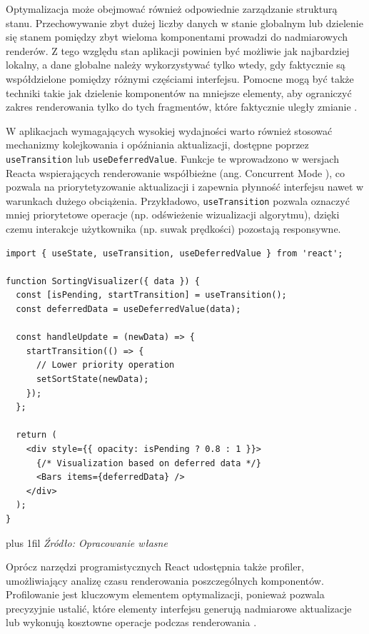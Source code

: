 \documentclass[12pt,openright,twoside]{report}
\newcommand{\source}[1]{{\par\vspace{5pt}\noindent\leftskip=0pt \rightskip=0pt \parfillskip=0pt plus 1fil \footnotesize\textit{Źródło: #1}\par}}
\begin{document}
Optymalizacja może obejmować również odpowiednie zarządzanie strukturą stanu. Przechowywanie zbyt dużej liczby danych w stanie globalnym lub dzielenie się stanem pomiędzy zbyt wieloma komponentami prowadzi do nadmiarowych renderów. Z tego względu stan aplikacji powinien być możliwie jak najbardziej lokalny, a dane globalne należy wykorzystywać tylko wtedy, gdy faktycznie są współdzielone pomiędzy różnymi częściami interfejsu. Pomocne mogą być także techniki takie jak dzielenie komponentów na mniejsze elementy, aby ograniczyć zakres renderowania tylko do tych fragmentów, które faktycznie uległy zmianie \cite{Learn_React_Design}.

W aplikacjach wymagających wysokiej wydajności warto również stosować mechanizmy kolejkowania i opóźniania aktualizacji, dostępne poprzez \texttt{useTransition} lub \texttt{useDeferredValue}. Funkcje te wprowadzono w wersjach Reacta wspierających renderowanie współbieżne (ang. Concurrent Mode \cite{Learning_React_Third}), co pozwala na priorytetyzowanie aktualizacji i zapewnia płynność interfejsu nawet w warunkach dużego obciążenia. Przykładowo, \texttt{useTransition} pozwala oznaczyć mniej priorytetowe operacje (np. odświeżenie wizualizacji algorytmu), dzięki czemu interakcje użytkownika (np. suwak prędkości) pozostają responsywne.

\begin{lstlisting}[language=tsx, caption={Wykorzystanie hooków \texttt{useTransition} i \texttt{useDeferredValue} do zarządzania priorytetami renderowania.}, label={lst:react-concurrent}]
import { useState, useTransition, useDeferredValue } from 'react';

function SortingVisualizer({ data }) {
  const [isPending, startTransition] = useTransition();
  const deferredData = useDeferredValue(data);

  const handleUpdate = (newData) => {
    startTransition(() => {
      // Lower priority operation
      setSortState(newData);
    });
  };

  return (
    <div style={{ opacity: isPending ? 0.8 : 1 }}>
      {/* Visualization based on deferred data */}
      <Bars items={deferredData} />
    </div>
  );
}
\end{lstlisting}
\source{Opracowanie własne}

Oprócz narzędzi programistycznych React udostępnia także profiler, umożliwiający analizę czasu renderowania poszczególnych komponentów. Profilowanie jest kluczowym elementem optymalizacji, ponieważ pozwala precyzyjnie ustalić, które elementy interfejsu generują nadmiarowe aktualizacje lub wykonują kosztowne operacje podczas renderowania \cite{Chrome_Runtime_Performance}.
\end{document}
